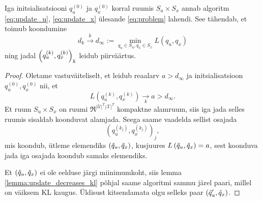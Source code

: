 \begin{theorem}
\label{theorem:vi_finds_min}
Iga initsialisatsiooni $q_u^{(0)}$ ja $q_x^{(0)}$ korral ruumis $S_u \times S_x$ annab algoritm \eqref{eq:update_u}, \eqref{eq:update_x} ülesande \eqref{eq:problem} lahendi. See tähendab, et toimub koondumine
\[
d_k \xrightarrow[]{k} d_\infty := \min_{q_u \in S_u, q_x \in S_x} L(q_u, q_x)
\]
ning jadal $\Bigl( q_u^{(k)}, q_x^{(k)}\Bigr)_k$ leidub piirväärtus.

\end{theorem}

\begin{proof}
Oletame vastuväiteliselt, et leidub reaalarv $a > d_\infty$ ja initsialisatsioon $q_u^{(0)}, q_x^{(0)}$ nii, et 
\begin{equation}
    \label{contradiction_assumption}
    L \left( q_u^{(k)}, q_x^{(k)}\right) \xrightarrow[k]{} a > d_\infty.
\end{equation}
Et ruum $S_u \times S_x $ on ruumi $\Re^{|\mathcal{U}|^T |\mathcal{X}|^T}$ kompaktne alamruum, siis iga jada selles ruumis sisaldab koonduvat alamjada. Seega saame vaadelda sellist osajada
$$\left(q_u^{(k_j)}, q_x^{(k_j)}\right)_j,$$
mis koondub, ütleme elemendiks $(\Tilde{q}_u, \Tilde{q}_x)$, kusjuures $L \left( \Tilde{q}_u, \Tilde{q}_x \right) = a$, sest koonduva jada iga osajada koondub samaks elemendiks.

Et $(\Tilde{q}_u, \Tilde{q}_x)$ ei ole eelduse järgi miinimumkoht, siis lemma \ref{lemma:update_decreases_kl} põhjal saame algoritmi sammu järel paari, millel on väiksem KL kaugus. Üldisust kitsendamata olgu selleks paar $(\Tilde{q}'_u, \Tilde{q}_x)$.


\end{proof}
